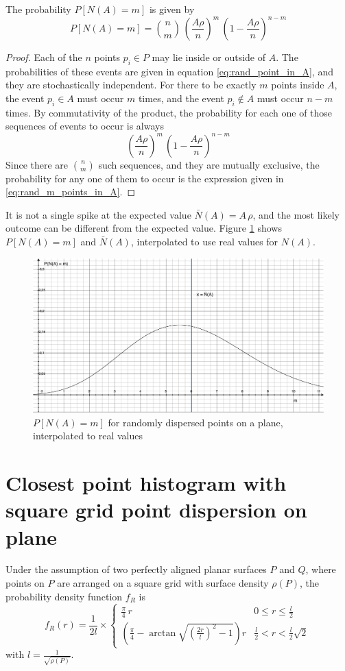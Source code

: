 The probability $P[N(A) = m]$ is given by
\begin{equation} \label{eq:rand_m_points_in_A}
P[N(A) = m] = \binom{n}{m} \, \left( \frac{A \rho}{n} \right)^m \, \left( 1 - \frac{A \rho}{n} \right)^{n-m}
\end{equation}

\begin{proof}
Each of the $n$ points $p_i \in P$ may lie inside or outside of $A$. The probabilities of these events are given in equation \ref{eq:rand_point_in_A}, and they are stochastically independent. For there to be exactly $m$ points inside $A$, the event $p_i \in A$ must occur $m$ times, and the event $p_i \notin A$ must occur $n - m$ times.
By commutativity of the product, the probability for each one of those sequences of events to occur is always
\begin{equation}
\left( \frac{A \rho}{n} \right)^m \, \left( 1 - \frac{A \rho}{n} \right)^{n-m}
\end{equation}
Since there are $\binom{n}{m}$ such sequences, and they are mutually exclusive, the probability for any one of them to occur is the expression given in \ref{eq:rand_m_points_in_A}.
\end{proof}

It is not a single spike at the expected value $\bar{N}(A) = A \, \rho$, and the most likely outcome can be different from the expected value. Figure \ref{fig:plane_rand_n} shows $P[N(A) = m]$ and $\bar{N}(A)$, interpolated to use real values for $N(A)$.

\begin{figure}[h]
\centering
\includegraphics[width=.6\textwidth]{fig/plane_rand_n.pdf}
\caption{$P[N(A) = m]$ for randomly dispersed points on a plane, interpolated to real values}
\label{fig:plane_rand_n}
\end{figure}


\section{Closest point histogram with square grid point dispersion on plane} \label{sec:proof_sqgrid_disp_plane}
Under the assumption of two perfectly aligned planar surfaces $P$ and $Q$, where points on $P$ are arranged on a square grid with surface density $\rho(P)$, the probability density function $f_R$ is
\begin{equation}
f_R(r) = \frac{1}{2 l} \times \begin{cases}
	\frac{\pi}{4} \, r & 0 \leq r \leq \frac{l}{2} \\
	\left( \frac{\pi}{4} - \arctan{\sqrt{\left( \frac{2r}{l} \right)^2 - 1}} \right) r & \frac{l}{2} < r < \frac{l}{2} \sqrt{2}
\end{cases}
\end{equation}
with $l = \frac{1}{\sqrt{\rho(P)}}$.

